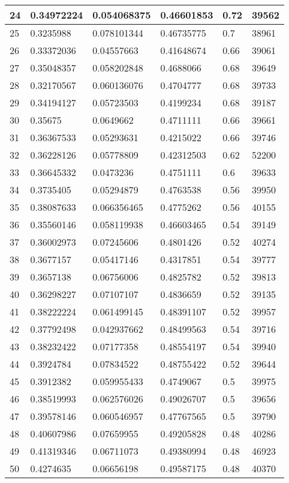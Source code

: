 \begin{longtable}{|l|l|l|l|l|l|}
24 & 0.34972224 & 0.054068375 & 0.46601853 & 0.72 & 39562 \\ \hline 
25 & 0.3235988 & 0.078101344 & 0.46735775 & 0.7 & 38961 \\ \hline 
26 & 0.33372036 & 0.04557663 & 0.41648674 & 0.66 & 39061 \\ \hline 
27 & 0.35048357 & 0.058202848 & 0.4688066 & 0.68 & 39649 \\ \hline 
28 & 0.32170567 & 0.060136076 & 0.4704777 & 0.68 & 39733 \\ \hline 
29 & 0.34194127 & 0.05723503 & 0.4199234 & 0.68 & 39187 \\ \hline 
30 & 0.35675 & 0.0649662 & 0.4711111 & 0.66 & 39661 \\ \hline 
31 & 0.36367533 & 0.05293631 & 0.4215022 & 0.66 & 39746 \\ \hline 
32 & 0.36228126 & 0.05778809 & 0.42312503 & 0.62 & 52200 \\ \hline 
33 & 0.36645332 & 0.0473236 & 0.4751111 & 0.6 & 39633 \\ \hline 
34 & 0.3735405 & 0.05294879 & 0.4763538 & 0.56 & 39950 \\ \hline 
35 & 0.38087633 & 0.066356465 & 0.4775262 & 0.56 & 40155 \\ \hline 
36 & 0.35560146 & 0.058119938 & 0.46603465 & 0.54 & 39149 \\ \hline 
37 & 0.36002973 & 0.07245606 & 0.4801426 & 0.52 & 40274 \\ \hline 
38 & 0.3677157 & 0.05417146 & 0.4317851 & 0.54 & 39777 \\ \hline 
39 & 0.3657138 & 0.06756006 & 0.4825782 & 0.52 & 39813 \\ \hline 
40 & 0.36298227 & 0.07107107 & 0.4836659 & 0.52 & 39135 \\ \hline 
41 & 0.38222224 & 0.061499145 & 0.48391107 & 0.52 & 39957 \\ \hline 
42 & 0.37792498 & 0.042937662 & 0.48499563 & 0.54 & 39716 \\ \hline 
43 & 0.38232422 & 0.07177358 & 0.48554197 & 0.54 & 39940 \\ \hline 
44 & 0.3924784 & 0.07834522 & 0.48755422 & 0.52 & 39644 \\ \hline 
45 & 0.3912382 & 0.059955433 & 0.4749067 & 0.5 & 39975 \\ \hline 
46 & 0.38519993 & 0.062576026 & 0.49026707 & 0.5 & 39656 \\ \hline 
47 & 0.39578146 & 0.060546957 & 0.47767565 & 0.5 & 39790 \\ \hline 
48 & 0.40607986 & 0.07659955 & 0.49205828 & 0.48 & 40286 \\ \hline 
49 & 0.41319346 & 0.06711073 & 0.49380994 & 0.48 & 46923 \\ \hline 
50 & 0.4274635 & 0.06656198 & 0.49587175 & 0.48 & 40370 \\ \hline 
\end{longtable}